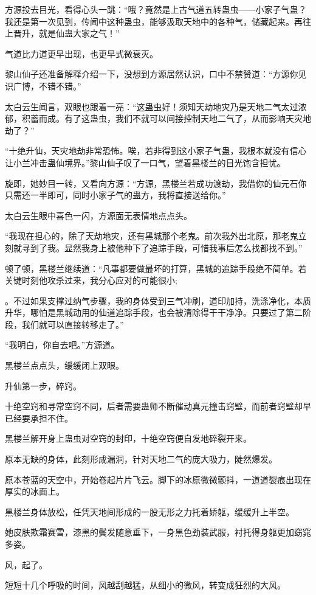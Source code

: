 \begin{this_body}
方源投去目光，看得心头一跳：“哦？竟然是上古气道五转蛊虫——小家子气蛊？我还是第一次见到，传闻中这种蛊虫，能够汲取天地中的各种气，储藏起来。再往上晋升，就是仙蛊大家之气！”

气道比力道更早出现，也更早式微衰灭。

黎山仙子还准备解释介绍一下，没想到方源居然认识，口中不禁赞道：“方源你见识广博，不错不错。”

太白云生闻言，双眼也跟着一亮：“这蛊虫好！须知天劫地灾乃是天地二气太过浓郁，积蓄而成。有了这蛊虫，我们不就可以间接控制天地二气了，从而影响天灾地劫了？”

“十绝升仙，天灾地劫非常恐怖。唉，若非得到这小家子气蛊，我根本就没有信心让小兰冲击蛊仙境界。”黎山仙子叹了一口气，望着黑楼兰的目光饱含担忧。

旋即，她妙目一转，又看向方源：“方源，黑楼兰若成功渡劫，我借你的仙元石你只需还一半即可，同时小家子气的蛊方，我将直接送给你。”

太白云生眼中喜色一闪，方源面无表情地点点头。

“我现在担心的，除了天劫地灾，还有黑城那个老鬼。前次我外出北原，那老鬼立刻就寻到了我。显然我身上被他种下了追踪手段，可惜我事后怎么找都找不到。”

顿了顿，黑楼兰继续道：“凡事都要做最坏的打算，黑城的追踪手段绝不简单。若关键时刻他攻杀过来，我分心应对的可能很小;

。不过如果支撑过纳气步骤，我的身体受到三气冲刷，道印加持，洗涤净化，本质升华，哪怕是黑城动用的仙道追踪手段，也会被清除得干干净净。只要过了第二阶段，我们就可以直接转移走了。”

“我明白，你自去吧。”方源道。

黑楼兰点点头，缓缓闭上双眼。

升仙第一步，碎窍。

十绝空窍和寻常空窍不同，后者需要蛊师不断催动真元撞击窍壁，而前者窍壁却早已经要承担不住。

黑楼兰解开身上蛊虫对空窍的封印，十绝空窍便自发地碎裂开来。

原本无缺的身体，此刻形成漏洞，针对天地二气的庞大吸力，陡然爆发。

原本苍蓝的天空中，开始卷起片片飞云。脚下的冰原微微颤抖，一道道裂痕出现在厚实的冰面上。

黑楼兰身体放松，任凭天地间形成的一股无形之力托着娇躯，缓缓升上半空。

她皮肤欺霜赛雪，漆黑的鬓发随意垂下，一身黑色劲装武服，衬托得身躯更加窈窕多姿。

风，起了。

短短十几个呼吸的时间，风越刮越猛，从细小的微风，转变成狂烈的大风。


\end{this_body}
